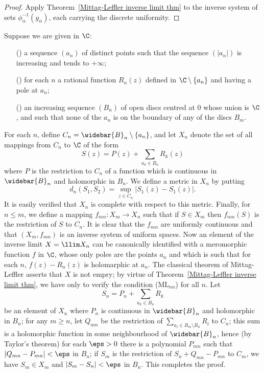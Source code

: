 \begin{proof}
Apply Theorem~\ref{Mittag-Leffler inverse limit thm} to the inverse system of sets $\phi_\alpha^{-1}(y_\alpha)$, each carrying the discrete uniformity.
\end{proof}
\begin{example}
Suppose we are given in $\C$:
\begin{itemize}
\item[(\rmnum{1})] a sequence $(a_n)$ of distinct points such that the sequence $(|a_n|)$ is increasing and tends to $+\infty$;
\item[(\rmnum{2})] for each $n$ a rational function $R_n(z)$ defined in $\C\setminus\{a_n\}$ and having a pole at $a_n$;
\item[(\rmnum{3})] an increasing sequence $(B_n)$ of open discs centred at $0$ whose union is $\C$, and such that none of the $a_n$ is on the boundary of any of the discs $B_m$.
\end{itemize}
For each $n$, define $C_n=\widebar{B}_n\setminus\{a_n\}$, and let $X_n$ denote the set of all mappings from $C_n$ to $\C$ of the form
\[S(z)=P(z)+\sum_{a_k\in B_n}R_k(z)\]
where $P$ is the restriction to $C_n$ of a function which is continuous in $\widebar{B}_n$ and holomorphic in $B_n$. We define a metric in $X_n$ by putting
\[d_n(S_1,S_2)=\sup_{z\in C_n}|S_1(z)-S_1(z)|.\]
It is easily verified that $X_n$ is complete with respect to this metric. Finally, for $n\leq m$, we define a mapping $f_{mn}:X_m\to X_n$ such that if $S\in X_m$ then $f_{nm}(S)$ is the restriction of $S$ to $C_n$. It is clear that the $f_{mn}$ are uniformly continuous and that $(X_m,f_{mn})$ is an inverse system of uniform spaces. Now an element of the inverse limit $X=\llim X_n$ can be canonically identified with a meromorphic function $f$ in $\C$, whose only poles are the points $a_n$ and which is such that for each $n$, $f(z)-R_n(z)$ is holomarphic at $a_n$. The classical theorem of Mittag-Leffler asserts that $X$ is not empry; by virtue of Theorem~\ref{Mittag-Leffler inverse limit thm}, we have only to verify the condition ($\text{ML}_{nn}$) for all $n$. Let
\[S_n=P_n+\sum_{a_k\in B_n}R_k\]
be an element of $X_n$ where $P_n$ is continuous in $\widebar{B}_n$ and holomorphic in $B_n$; for any $m\geq n$, let $Q_{mn}$ be the restriction of
$\sum_{a_i\in B_m\setminus B_n}R_i$ to $C_n$; this sum is a holomorphic function in some neighbourhood of $\widebar{B}_n$, hence (by Taylor's theorem) for each $\eps>0$ there is a polynomial $P_{mn}$ such that $|Q_{mn}-P_{mn}|<\eps$ in $B_n$; if $S_m$ is the restriction of $S_n+Q_{mn}-P_{mn}$ to $C_m$, we have $S_m\in X_m$ and $|S_m-S_n|<\eps$ in $B_n$. This completes the proof.
\end{example}
